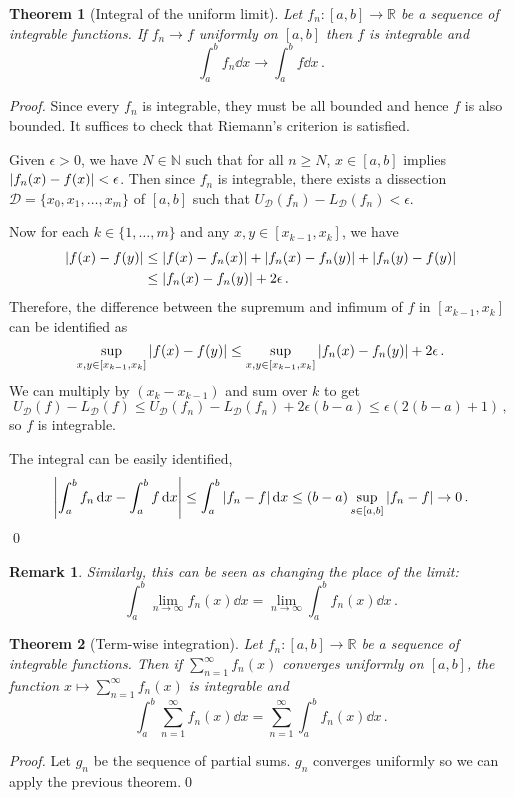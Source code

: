 \documentclass{article}
\theoremstyle{plain}\theoremheaderfont{\normalfont\itshape}\theorembodyfont{\rmfamily}\theoremseparator{.}\newtheorem*{rem}{Remark}\newtheorem*{ex}{Example}\newtheorem*{proof}{Proof}\newtheorem*{altp}{Alternative proof}
\theoremstyle{plain}\theoremheaderfont{\normalfont\bfseries}\theorembodyfont{\rmfamily}\theoremseparator{.}\newtheorem{thm}{Theorem}[section]\newtheorem{lem}[thm]{Lemma}\newtheorem{prop}[thm]{Proposition}\newtheorem*{cor}{Corollary}\newtheorem{defn}[thm]{Definition}\newtheorem{clm}[thm]{Claim}\newtheorem{clminproof}{Claim}
\theoremstyle{break}\theoremheaderfont{\normalfont\itshape}\theorembodyfont{\rmfamily}\theoremseparator{.\medskip}\newtheorem*{proofskip}{Proof}\newtheorem*{exs}{Examples}\newtheorem*{rems}{Remarks}
\theoremstyle{break}\theoremheaderfont{\normalfont\bfseries}\theorembodyfont{\rmfamily}\theoremseparator{.\medskip}\newtheorem{lemskip}[thm]{Lemma}\newtheorem{defnskip}[thm]{Definition}\newtheorem{propskip}[thm]{Proposition}\newtheorem{thmskip}[thm]{Theorem}
\newcommand{\qed}{\hfill\ensuremath{\Box}}
\begin{document}
    \begin{thm}[Integral of the uniform limit]
        Let \(f_n:[a,b]\to\mathbb{R}\) be a sequence of integrable functions. If \(f_n\to f\) uniformly on \([a,b]\) then \(f\) is integrable and
        \[\int_{a}^{b}f_n\dd{x}\to\int_{a}^{b}f\dd{x}\,.\]
    \end{thm}
    \begin{proof}
        Since every \(f_n\) is integrable, they must be all bounded and hence \(f\) is also bounded. It suffices to check that Riemann's criterion is satisfied.

        Given \(\epsilon>0\), we have \(N\in\mathbb{N}\) such that for all \(n\ge N\), \(x\in[a,b]\) implies \(\abs{f_n(x)-f(x)}<\epsilon\). Then since \(f_n\) is integrable, there exists a dissection \(\mathcal{D}=\{x_0,x_1,\dots,x_m\}\) of \([a,b]\) such that \(U_\mathcal{D}(f_n)-L_\mathcal{D}(f_n)<\epsilon\).
        
        Now for each \(k\in\{1,\dots,m\}\) and any \(x,y\in[x_{k-1},x_k]\), we have
        \begin{align*}
            \abs{f(x)-f(y)}&\le\abs{f(x)-f_n(x)}+\abs{f_n(x)-f_n(y)}+\abs{f_n(y)-f(y)}\\
            &\le\abs{f_n(x)-f_n(y)}+2\epsilon\,.
        \end{align*}
        Therefore, the difference between the supremum and infimum of \(f\) in \([x_{k-1},x_k]\) can be identified as
        \[\sup_{x,y\in[x_{k-1},x_k]}\abs{f(x)-f(y)}\le\sup_{x,y\in[x_{k-1},x_k]}\abs{f_n(x)-f_n(y)}+2\epsilon\,.\]
        We can multiply by \((x_{k}-x_{k-1})\) and sum over \(k\) to get
        \[U_\mathcal{D}(f)-L_\mathcal{D}(f)\le U_\mathcal{D}(f_n)-L_\mathcal{D}(f_n)+2\epsilon(b-a)\le \epsilon(2(b-a)+1)\,,\]
        so \(f\) is integrable.

        The integral can be easily identified,
        \begin{align*}
            \abs{\int_{a}^{b}f_n\dd{x}-\int_{a}^{b}f\dd{x}}\le\int_{a}^{b}\abs{f_n-f}\dd{x}\le(b-a)\sup_{s\in[a,b]}\abs{f_n-f}\to 0\,.
        \end{align*}\qed
    \end{proof}
    \begin{rem}
        Similarly, this can be seen as changing the place of the limit:
        \[\int_{a}^{b}\lim_{n\to\infty}f_n(x)\dd{x}=\lim_{n\to\infty}\int_{a}^{b}f_n(x)\dd{x}\,.\]
    \end{rem}

    \begin{thm}[Term-wise integration]
        Let \(f_n:[a,b]\to\mathbb{R}\) be a sequence of integrable functions. Then if \(\sum_{n=1}^{\infty}f_n(x)\) converges uniformly on \([a,b]\), the function \(x\mapsto\sum_{n=1}^{\infty}f_n(x)\) is integrable and 
        \[\int_{a}^{b}\sum_{n=1}^{\infty}f_n(x)\dd{x}=\sum_{n=1}^{\infty}\int_{a}^{b}f_n(x)\dd{x}\,.\]
    \end{thm}
    \begin{proof}
        Let \(g_n\) be the sequence of partial sums. \(g_n\) converges uniformly so we can apply the previous theorem.\qed
    \end{proof}
\end{document}
